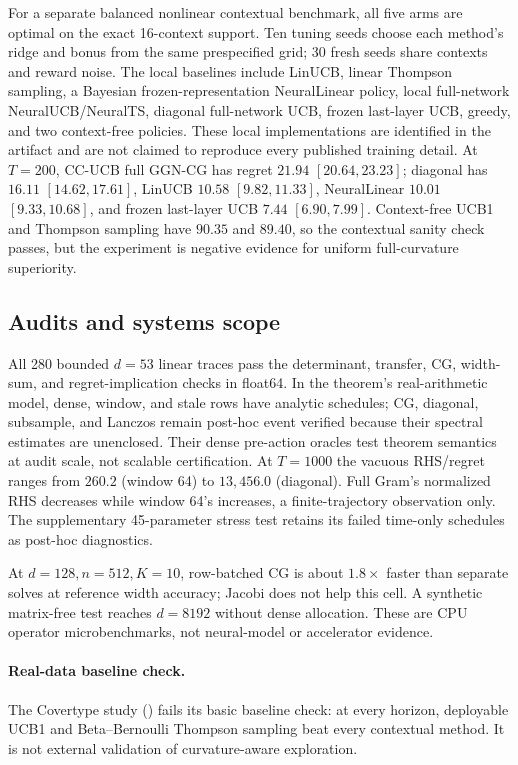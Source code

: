 \documentclass[twoside]{article}
\begin{document}
For a separate balanced nonlinear contextual benchmark, all five arms are optimal
on the exact 16-context support.  Ten tuning seeds choose each method's ridge and
bonus from the same prespecified grid; 30 fresh seeds share contexts and reward
noise.  The local baselines include LinUCB, linear Thompson sampling, a Bayesian
frozen-representation NeuralLinear policy, local full-network NeuralUCB/NeuralTS,
diagonal full-network UCB, frozen last-layer UCB, greedy, and two context-free
policies.  These local implementations are identified in the artifact and are not
claimed to reproduce every published training detail.  At $T=200$, CC-UCB full
GGN-CG has regret $21.94$ $[20.64,23.23]$; diagonal has $16.11$
$[14.62,17.61]$, LinUCB $10.58$ $[9.82,11.33]$, NeuralLinear $10.01$
$[9.33,10.68]$, and frozen last-layer UCB $7.44$ $[6.90,7.99]$.  Context-free
UCB1 and Thompson sampling have $90.35$ and $89.40$, so the contextual sanity
check passes, but the experiment is negative evidence for uniform full-curvature
superiority.

\subsection{Audits and systems scope}
All 280 bounded $d=53$ linear traces pass the determinant, transfer, CG,
width-sum, and regret-implication checks in float64.  In the theorem's
real-arithmetic model, dense, window, and stale rows have analytic schedules;
CG, diagonal, subsample, and Lanczos remain post-hoc event verified because their
spectral estimates are unenclosed.  Their dense pre-action oracles test theorem
semantics at audit scale, not scalable certification.  At $T=1000$ the vacuous
RHS/regret ranges from $260.2$ (window 64) to $13{,}456.0$ (diagonal).  Full
Gram's normalized RHS decreases while window 64's increases, a finite-trajectory
observation only.  The supplementary 45-parameter stress test retains its failed
time-only schedules as post-hoc diagnostics.

At $d=128,n=512,K=10$, row-batched CG is about $1.8\times$ faster than separate
solves at reference width accuracy; Jacobi does not help this cell.  A synthetic
matrix-free test reaches $d=8192$ without dense allocation.  These are CPU
operator microbenchmarks, not neural-model or accelerator evidence.

\paragraph{Real-data baseline check.}
The Covertype study () fails its basic baseline check:
at every horizon, deployable UCB1 and Beta--Bernoulli Thompson sampling beat every
contextual method.  It is not external validation of curvature-aware exploration.
\end{document}
